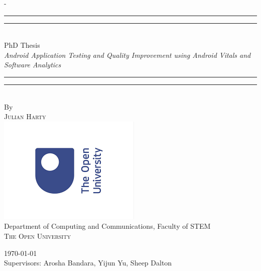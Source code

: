 \begin{titlingpage}
\begin{SingleSpace}
\calccentering{\unitlength} 
\begin{adjustwidth*}{\unitlength}{-\unitlength}
\vspace*{13mm}
\begin{center}
\rule[0.5ex]{\linewidth}{2pt}\vspace*{-\baselineskip}\vspace*{3.2pt}
\rule[0.5ex]{\linewidth}{1pt}\\[\baselineskip]
{\HUGE PhD Thesis}\\[4mm]
{\Large \textit{Android Application Testing and Quality Improvement using Android Vitals and Software Analytics}}\\
\rule[0.5ex]{\linewidth}{1pt}\vspace*{-\baselineskip}\vspace{3.2pt}
\rule[0.5ex]{\linewidth}{2pt}\\
\vspace{6.5mm}
{\large By}\\
\vspace{6.5mm}
{\large\textsc{Julian Harty}}\\
\vspace{11mm}
\includegraphics[scale=0.6]{images/ou-logo.png}\\
\vspace{6mm}
{\large Department of Computing and Communications, Faculty of STEM\\
\textsc{The Open University}}\\
\vspace{11mm}

\vspace{9mm}
{\large\textsc{\today}}\\
\vspace{12mm}
{\large Supervisors: Arosha Bandara, Yijun Yu, Sheep Dalton}

\end{center}
\end{adjustwidth*}
\end{SingleSpace}
\end{titlingpage}